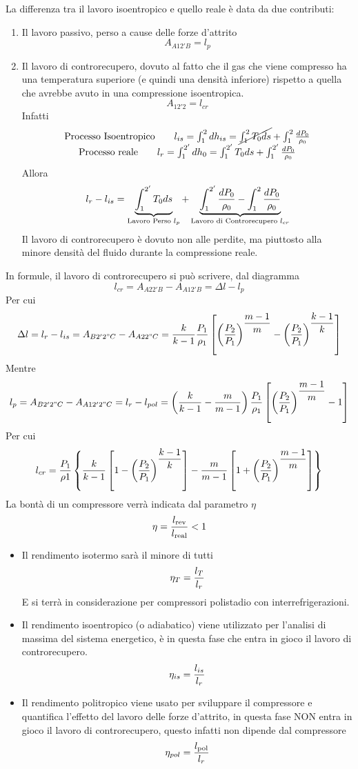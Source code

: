 \begin{adjustwidth}{2in}{}
	
	La differenza tra il lavoro isoentropico e quello reale è data da due contributi:
	
	\begin{enumerate}
		\item Il lavoro passivo, perso a cause delle forze d'attrito
		\[A_{A12'B} = l_p\]
		\item Il lavoro di controrecupero, dovuto al fatto che il gas che viene compresso ha una temperatura superiore (e quindi una densità inferiore) rispetto a quella che avrebbe avuto in una compressione isoentropica. 
		\[A_{12'2} = l_{cr}\]			
		Infatti
		\[\begin{matrix}
			\text{Processo Isoentropico}\qquad l_{is} = \int_{1}^{2}dh_{is} = \cancel{\int_{1}^{2}T_0ds} + \int_{1}^{2} {dP_0\over\rho_0} \\
			\text{Processo reale}\qquad l_r = \int_{1}^{2'}dh_0 = \int_{1}^{2'}T_0ds + \int_{1}^{2'} {dP_0\over\rho_0} \\
		\end{matrix}\]
		Allora 
		\[l_r - l_{is} = \underbrace{\int_{1}^{2'}T_0ds}_\text{Lavoro Perso $l_p$} + \underbrace{\int_{1}^{2'} {dP_0\over\rho_0} - \int_{1}^{2} {dP_0\over\rho_0}}_\text{Lavoro di Controrecupero $l_{cr}$}\]
		Il lavoro di controrecupero è dovuto non alle perdite, ma piuttosto alla minore densità del fluido durante la compressione reale. 
	\end{enumerate}
	
	In formule, il lavoro di controrecupero si può scrivere, dal diagramma
	\[l_{cr} = A_{A22'B} - A_{A12'B} = \Delta l - l_p\]
	Per cui
	\[\Delta l = l_r-l_{is} = A_{B2'2"C} - A_{A22"C} = \dfrac{k}{k-1}{P_1\over\rho_1}\left[\left(P_2\over P_1\right)^{\dfrac{m-1}{m}}-\left(P_2\over P_1\right)^{\dfrac{k-1}{k}}\right]\]
	Mentre
	\[l_p = A_{B2'2"C} - A_{A12'2"C} =  l_r - l_{pol} = \left(\dfrac{k}{k-1}-\dfrac{m}{m-1}\right){P_1\over\rho_1}\left[\left(P_2\over P_1\right)^{\dfrac{m-1}{m}}-1\right]\]
	Per cui
	\[l_{cr} = {P_1\over\rho1}\left\{\dfrac{k}{k-1}\left[1-\left(P_2\over P_1\right)^{\dfrac{k-1}{k}}  \right] - \dfrac{m}{m-1}\left[1+\left(P_2\over P_1\right)^{\dfrac{m-1}{m}}  \right] \right\}\] 
	La bontà di un compressore verrà indicata dal parametro $\eta$
	\[\eta = {l_\text{rev}\over l_\text{real}}<1\]
	\begin{itemize}
		\item Il rendimento isotermo sarà il minore di tutti
		\[\eta_T = {l_T\over l_r}\]
		E si terrà in considerazione per compressori polistadio con interrefrigerazioni.
		\item Il rendimento isoentropico (o adiabatico) viene utilizzato per l'analisi di massima del sistema energetico, è in questa fase che entra in gioco il lavoro di controrecupero.
		\[\eta_{is} = {l_{is}\over l_r}\]
		\item Il rendimento politropico viene usato per sviluppare il compressore e quantifica l'effetto del lavoro delle forze d'attrito, in questa fase NON entra in gioco il lavoro di controrecupero, questo infatti non dipende dal compressore
		\[\eta_{pol} = {l_\text{pol}\over l_r}\]
		

\end{itemize}
\end{adjustwidth}
